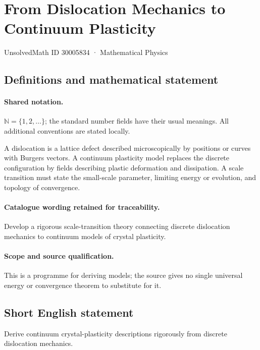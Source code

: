 \documentclass[11pt]{article}
\begin{document}
\setcounter{section}{30005833}
\section{From Dislocation Mechanics to Continuum Plasticity}\label{30005834}
{\small UnsolvedMath ID 30005834 · Mathematical Physics}
\subsection{Definitions and mathematical statement}

\paragraph{Shared notation.}$\mathbb N=\{1,2,\ldots\}$; the standard number fields have their usual meanings. All additional conventions are stated locally.


A dislocation is a lattice defect described microscopically by positions or curves with Burgers vectors. A continuum plasticity model replaces the discrete configuration by fields describing plastic deformation and dissipation. A scale transition must state the small-scale parameter, limiting energy or evolution, and topology of convergence.

\paragraph{Catalogue wording retained for traceability.}
Develop a rigorous scale-transition theory connecting discrete dislocation mechanics to continuum models of crystal plasticity.

\paragraph{Scope and source qualification.}This is a programme for deriving models; the source gives no single universal energy or convergence theorem to substitute for it.
\subsection{Short English statement}
Derive continuum crystal-plasticity descriptions rigorously from discrete dislocation mechanics.
\end{document}
